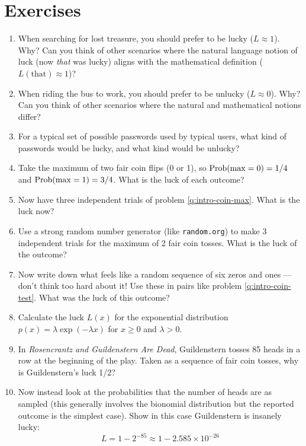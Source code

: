 \section{Exercises}
\begin{enumerate}
  \item \label{q:intro-treasure} When searching for lost treasure, you should prefer to be lucky ($L \approx 1$). Why? Can you think of other scenarios where the natural language notion of luck (now {\it that} was lucky) aligns with the mathematical definition ($L(\text{that}) \approx 1$)?
  \item \label{q:intro-bus} When riding the bus to work, you should prefer to be unlucky ($L \approx 0$). Why? Can you think of other scenarios where the natural and mathematical notions differ?
  \item \label{q:intro-password} For a typical set of possible passwords used by typical users, what kind of passwords would be lucky, and what kind would be unlucky?
  
\item \label{q:intro-coin-max} Take the maximum of two fair coin flips (0 or 1), so $\operatorname{Prob}(\max = 0)=1/4$ and $\operatorname{Prob}(\max = 1)=3/4$.  What is the luck of each outcome?
\item \label{q:intro-coin-max-3} Now have three independent trials of problem \ref{q:intro-coin-max}. What is the luck now?
\item \label{q:intro-coin-test} Use a strong random number generator (like {\tt random.org}) to make 3 independent trials for the maximum of 2 fair coin tosses.  What is the luck of the outcome?
\item \label{q:intro-coin-human-test} Now write down what feels like a random sequence of six zeros and ones --- don't think too hard about it!  Use these in pairs like problem \ref{q:intro-coin-test}.  What was the luck of this outcome?
\item \label{q:intro-exp} Calculate the luck $L(x)$ for the exponential distribution $p(x)=\lambda \exp(-\lambda x)$ for $x\geq 0$ and $\lambda > 0$.

\item \label{q:intro-rgd-1} In {\em Rosencrantz and Guildenstern Are Dead}, Guildenstern tosses 85 heads in a row at the beginning of the play.  Taken as a sequence of fair coin tosses, why is Guildenstern's luck 1/2?

\item \label{q:intro-rgd-2} Now instead look at the probabilities that the number of heads are as sampled (this generally involves the bionomial distribution but the reported outcome is the simplest case).  Show in this case Guildenstern is insanely lucky:
  \begin{equation*}
  L=1-2^{-85} \approx 1-2.585\times 10^{-26}
  \end{equation*}
\end{enumerate}

